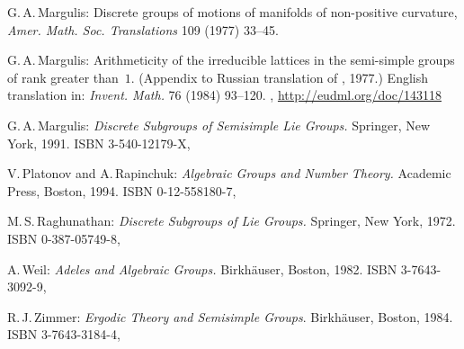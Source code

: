 \begin{references}{99}
 G.\,A.\,Margulis: 
 Discrete groups of motions of manifolds of non-positive curvature,
 \emph{Amer. Math. Soc. Translations} 109 (1977) 33--45.

 G.\,A.\,Margulis: 
 Arithmeticity of the irreducible lattices in the
semi-simple groups of rank greater than~$1$.
 (Appendix to Russian translation of \cite{RaghunathanBook},
1977.)
 English translation in:
 \emph{Invent. Math.} 76 (1984) 93--120.
 ,
 \maynewline
 \url{http://eudml.org/doc/143118}

 G.\,A.\,Margulis:
 \emph{Discrete Subgroups of Semisimple Lie Groups.}
 Springer, {New York}, 1991.
ISBN 3-540-12179-X,

 V.\,Platonov and A.\,Rapinchuk: 
 \emph{Algebraic Groups and Number Theory.}
 Academic Press, Boston, 1994.
 ISBN 0-12-558180-7,

 M.\,S.\,Raghunathan: 
 \emph{Discrete Subgroups of Lie Groups.}
 Springer, {New York}, 1972.
 ISBN 0-387-05749-8,



A.\,Weil:
\emph{Adeles and Algebraic Groups.}
Birkh\"auser, Boston, 1982. 
ISBN 3-7643-3092-9,

 R.\,J.\,Zimmer:
 \emph{Ergodic Theory and Semisimple Groups}.
 Birkh\"auser, Boston, 1984.
 ISBN 3-7643-3184-4,

 \end{references}